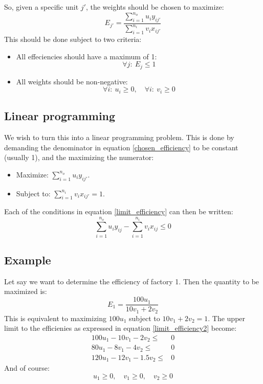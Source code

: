 \documentclass[12pt, a4paper]{article}
\numberwithin{equation}{section}
\begin{document}
So, given a specific unit $j'$, the weights should be chosen to maximize:
\begin{equation}
E_{j'}=\frac{\sum_{i=1}^{n_o}u_i y_{ij'}}{\sum_{i=1}^{n_i}v_i x_{ij'}}
\label{chosen_efficiency}
\end{equation}
This should be done subject to two criteria:
\begin{itemize}
\item All effeciencies should have a maximum of 1:
\begin{equation}
\forall j:\ E_j\le 1
\label{limit_efficiency}
\end{equation}
\item All weights should be non-negative:
\begin{equation}
\forall i:\ u_i\ge 0,\quad\forall i:\ v_i\ge 0
\end{equation}
\end{itemize}

\subsection{Linear programming}
We wish to turn this into a linear programming problem. This is done by demanding the denominator in equation \ref{chosen_efficiency} to be constant (usually 1), and the maximizing the numerator:
\begin{itemize}
\item Maximize: $\sum_{i=1}^{n_o}u_i y_{ij'}$.
\item Subject to: $\sum_{i=1}^{n_i}v_i x_{ij'}=1$.
\end{itemize}
Each of the conditions in equation \ref{limit_efficiency} can then be written:
\begin{equation}
\sum_{i=1}^{n_o}u_i y_{ij}-\sum_{i=1}^{n_i}v_i x_{ij}\le 0
\label{limit_efficiency2}
\end{equation}

\subsection{Example}
Let say we want to determine the efficiency of factory 1. Then the quantity to be maximized is:
\begin{equation}
E_1=\frac{100 u_1}{10 v_1+2 v_2}
\end{equation}
This is equivalent to maximizing $100 u_1$ subject to $10 v_1+2 v_2=1$. The upper limit to the efficienies as expressed in equation \ref{limit_efficiency2} become:
\begin{align}
100 u_1-10 v_1-2 v_2 \le &0\\
80 u_1-8 v_1-4 v_2 \le &0\\
120 u_1-12 v_1-1.5 v_2 \le &0
\end{align}
And of course:
\begin{equation}
u_1\ge 0,\quad v_1\ge 0,\quad v_2\ge 0
\end{equation}
\end{document}
